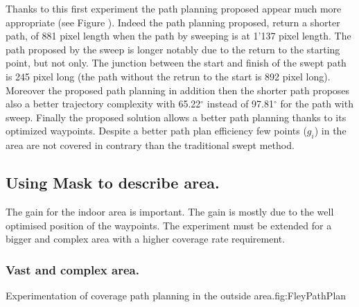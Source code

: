 Thanks to this first experiment the path planning proposed appear much more appropriate (see Figure ). Indeed the path planning proposed, return a shorter path, of 881 pixel length when  the path by sweeping is at 1'137 pixel length. The path proposed by the sweep is longer notably due to the return to the starting point, but not only. The junction between the start and finish of the swept path is 245 pixel long (the path without the retrun to the start is 892  pixel long).%
 Moreover the proposed path planning in addition then the shorter path proposes also a better trajectory complexity  with 65.22$^\circ$ instead of 97.81$^\circ$ for the path with sweep.
Finally the proposed solution allows a better path planning thanks to its optimized waypoints. Despite a better path plan efficiency few points ($g_i$) in the area are not covered in contrary than the traditional swept method.



\subsection{Using Mask to describe area.}\label{coverageOutDoor}

The gain for the indoor area is important. The gain is mostly due to the well optimised position of the waypoints. The experiment must be extended for a bigger and complex area with a higher coverage rate requirement.


\subsubsection{Vast and complex area.} \label{fey_map_CPPP}
 
 \begin{mfigures}[!]{Experimentation of coverage path planning in the outside area.}{fig:FleyPathPlan} \centering
\hspace{1cm}

\tabsimuposeFleyPath
\end{mfigures} 
 
